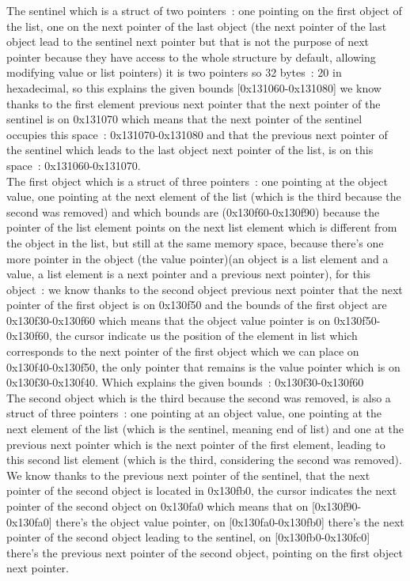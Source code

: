 \documentclass[a4paper, 11pt]{article}
\begin{document}
The sentinel which is a struct of two pointers : one pointing on the first object of the list, one on the next pointer of the last object (the next pointer of the last object lead to the sentinel next pointer but that is not the purpose of next pointer because they have access to the whole structure by default, allowing modifying value or list pointers) it is two pointers so 32 bytes : 20 in hexadecimal, so this explains the given bounds [0x131060-0x131080] we know thanks to the first element previous next pointer that the next pointer of the sentinel is on 0x131070 which means that the next pointer of the sentinel occupies this space : 0x131070-0x131080 and that the previous next pointer of the sentinel which leads to the last object next pointer of the list, is on this space : 0x131060-0x131070.\\
The first object which is a struct of three pointers : one pointing at the object value, one pointing at the next element of the list (which is the third because the second was removed) and which bounds are (0x130f60-0x130f90) because the pointer of the list element points on the next list element which is different from the object in the list, but still at the same memory space, because there’s one more pointer in the object (the value pointer)(an object is a list element and a value, a list element is a next pointer and a previous next pointer), for this object : we know thanks to the second object previous next pointer that the next pointer of the first object is on 0x130f50 and the bounds of the first object are 0x130f30-0x130f60 which means that the object value pointer is on 0x130f50-0x130f60, the cursor indicate us the position of the element in list which corresponds to the next pointer of the first object which we can place on 0x130f40-0x130f50, the only pointer that remains is the value pointer which is on 0x130f30-0x130f40. Which explains the given bounds : 0x130f30-0x130f60\\
The second object which is the third because the second was removed, is also a struct of three pointers : one pointing at an object value, one pointing at the next element of the list (which is the sentinel, meaning end of list) and one at the previous next pointer which is the next pointer of the first element, leading to this second list element (which is the third, considering the second was removed). We know thanks to the previous next pointer of the sentinel, that the next pointer of the second object is located in 0x130fb0, the cursor indicates the next pointer of the second object on 0x130fa0 which means that on [0x130f90-0x130fa0] there’s the object value pointer, on [0x130fa0-0x130fb0] there’s the next pointer of the second object leading to the sentinel, on [0x130fb0-0x130fc0] there’s the previous next pointer of the second object, pointing on the first object next pointer.\\
\end{document}
